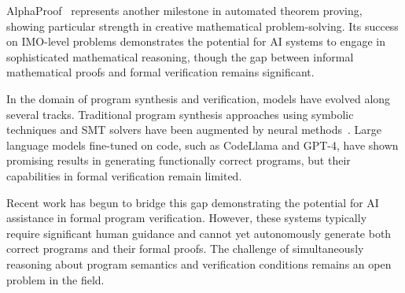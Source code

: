 AlphaProof~\cite{deepmind2024imo} represents another milestone in automated theorem proving, showing particular strength in creative mathematical problem-solving. Its success on IMO-level problems demonstrates the potential for AI systems to engage in sophisticated mathematical reasoning, though the gap between informal mathematical proofs and formal verification remains significant.

In the domain of program synthesis and verification, models have evolved along several tracks. Traditional program synthesis approaches using symbolic techniques and SMT solvers have been augmented by neural methods~\cite{wang2023legoprover}. Large language models fine-tuned on code, such as CodeLlama \cite{Rozire2023CodeLO} and GPT-4\cite{gpt4}, have shown promising results in generating functionally correct programs, but their capabilities in formal verification remain limited.

Recent work has begun to bridge this gap \cite{Baif2024DafnyCopilot, yang2024autoverusautomatedproofgeneration} demonstrating the potential for AI assistance in formal program verification. However, these systems typically require significant human guidance and cannot yet autonomously generate both correct programs and their formal proofs. The challenge of simultaneously reasoning about program semantics and verification conditions remains an open problem in the field.